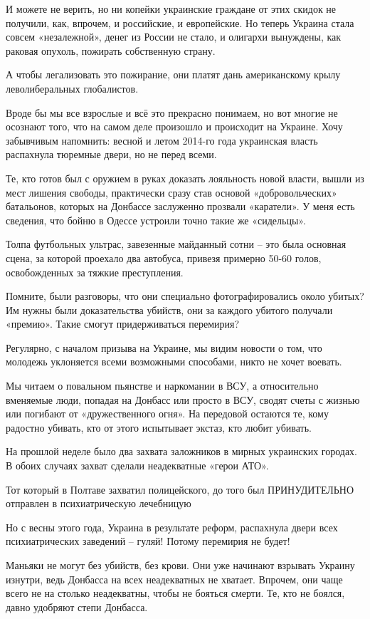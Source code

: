 И можете не верить, но ни копейки украинские граждане от этих скидок не получили, как, впрочем, и российские, и европейские.
Но теперь Украина стала совсем «незалежной», денег из России не стало, и олигархи вынуждены, как раковая опухоль, пожирать собственную страну.

А чтобы легализовать это пожирание, они платят дань американскому крылу леволиберальных глобалистов.

Вроде бы мы все взрослые и всё это прекрасно понимаем, но вот многие не осознают того, что на самом деле произошло и происходит на Украине.
Хочу забывчивым напомнить:
весной и летом 2014-го года украинская власть распахнула тюремные двери, но не перед всеми.

Те, кто готов был с оружием в руках доказать лояльность новой власти, вышли из мест лишения свободы, практически сразу став основой «добровольческих» батальонов, которых на Донбассе заслуженно прозвали «каратели».
У меня есть сведения, что бойню в Одессе устроили точно такие же «сидельцы».

Толпа футбольных ультрас, завезенные майданный сотни – это была основная сцена, за которой проехало два автобуса, привезя примерно 50-60 голов, освобожденных за тяжкие преступления.

Помните, были разговоры, что они специально фотографировались около убитых?
Им нужны были доказательства убийств, они за каждого убитого получали «премию».
Такие смогут придерживаться перемирия?

Регулярно, с началом призыва на Украине, мы видим новости о том, что молодежь уклоняется всеми возможными способами, никто не хочет воевать.

Мы читаем о повальном пьянстве и наркомании в ВСУ, а относительно вменяемые люди, попадая на Донбасс или просто в ВСУ, сводят счеты с жизнью или погибают от «дружественного огня».
На передовой остаются те, кому радостно убивать, кто от этого испытывает экстаз, кто любит убивать.

На прошлой неделе было два захвата заложников в мирных украинских городах.
В обоих случаях захват сделали неадекватные «герои АТО».

Тот который в Полтаве захватил полицейского, до того был ПРИНУДИТЕЛЬНО отправлен в психиатрическую лечебницую

Но с весны этого года, Украина в результате реформ, распахнула двери всех психиатрических заведений – гуляй!
Потому перемирия не будет!

Маньяки не могут без убийств, без крови. Они уже начинают взрывать Украину изнутри, ведь Донбасса на всех неадекватных не хватает.
Впрочем, они чаще всего не на столько неадекватны, чтобы не бояться смерти.
Те, кто не боялся, давно удобряют степи Донбасса.

